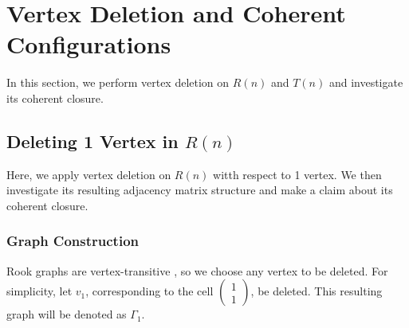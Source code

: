 \section{Vertex Deletion and Coherent Configurations}
In this section, we perform vertex deletion on $R(n)$ and $T(n)$ and investigate its coherent closure.
\subsection{Deleting 1 Vertex in \texorpdfstring{$R(n)$}{R(n)}}
Here, we apply vertex deletion on $R(n)$ witth respect to 1 vertex. We then investigate its resulting adjacency matrix structure and make a claim about its coherent closure.
\subsubsection{Graph Construction}

Rook graphs are vertex-transitive \cite{godsil2001algebraic}, so we choose any vertex to be deleted. For simplicity, let \( v_1 \), corresponding to the cell \( \begin{pmatrix} 1 \\ 1 \end{pmatrix} \), be deleted. This resulting graph will be denoted as $\Gamma_1$.

